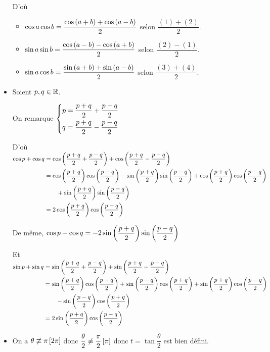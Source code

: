 \begin{itemize}
D'où \begin{itemize}
\item \(\cos a\cos b=\dfrac{\cos\left(a+b\right)+\cos\left(a-b\right)}{2}\) selon \(\dfrac{(1)+(2)}{2}\).

\item \(\sin a\sin b=\dfrac{\cos\left(a-b\right)-\cos\left(a+b\right)}{2}\) selon \(\dfrac{(2)-(1)}{2}\).

\item \(\sin a\cos b=\dfrac{\sin\left(a+b\right)+\sin\left(a-b\right)}{2}\) selon \(\dfrac{(3)+(4)}{2}\).
\end{itemize}

\item Soient \(p,q\in\mathbb{R}\).

On remarque \(\begin{dcases}p=\dfrac{p+q}{2}+\dfrac{p-q}{2} \\ q=\dfrac{p+q}{2}-\dfrac{p-q}{2}\end{dcases}\)

D'où \(\begin{aligned}[t]
\cos p+\cos q&=\cos\left(\dfrac{p+q}{2}+\dfrac{p-q}{2}\right)+\cos\left(\dfrac{p+q}{2}-\dfrac{p-q}{2}\right) \\
&=\cos\left(\dfrac{p+q}{2}\right)\cos\left(\dfrac{p-q}{2}\right)-\sin\left(\dfrac{p+q}{2}\right)\sin\left(\dfrac{p-q}{2}\right)+\cos\left(\dfrac{p+q}{2}\right)\cos\left(\dfrac{p-q}{2}\right)\notag \\
&\qquad+\sin\left(\dfrac{p+q}{2}\right)\sin\left(\dfrac{p-q}{2}\right) \\
&=2\cos\left(\dfrac{p+q}{2}\right)\cos\left(\dfrac{p-q}{2}\right)
\end{aligned}\)

De même, \(\cos p-\cos q=-2\sin\left(\dfrac{p+q}{2}\right)\sin\left(\dfrac{p-q}{2}\right)\)

Et \(\begin{aligned}[t]
\sin p+\sin q&=\sin\left(\dfrac{p+q}{2}+\dfrac{p-q}{2}\right)+\sin\left(\dfrac{p+q}{2}-\dfrac{p-q}{2}\right) \\
&=\sin\left(\dfrac{p+q}{2}\right)\cos\left(\dfrac{p-q}{2}\right)+\sin\left(\dfrac{p-q}{2}\right)\cos\left(\dfrac{p+q}{2}\right)+\sin\left(\dfrac{p+q}{2}\right)\cos\left(\dfrac{p-q}{2}\right)\notag \\
&\qquad-\sin\left(\dfrac{p-q}{2}\right)\cos\left(\dfrac{p+q}{2}\right) \\
&=2\sin\left(\dfrac{p+q}{2}\right)\cos\left(\dfrac{p-q}{2}\right)
\end{aligned}\)

\item On a \(\theta\not\equiv\pi\left[2\pi\right]\) donc \(\dfrac{\theta}{2}\not\equiv\dfrac{\pi}{2}\left[\pi\right]\) donc \(t=\tan\dfrac{\theta}{2}\) est bien défini.


\end{itemize}
